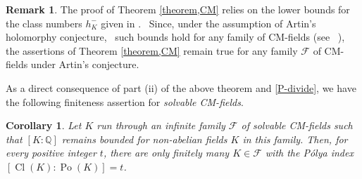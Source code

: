 \documentclass[12pt]{amsart}
\newtheorem{corollary}[theorem]{Corollary}
\theoremstyle{definition}
\newtheorem{remark}[theorem]{Remark}
\numberwithin{equation}{section}
\DeclareMathOperator{\Po}{Po}
\DeclareMathOperator{\Cl}{Cl}
\begin{document}
\begin{remark}
	The proof of Theorem \ref{theorem,CM} relies on the lower bounds for the class numbers $h_K^-$ given in \cite[Theorem 3.1]{Peng-Jie}.  Since, under the assumption of Artin's holomorphy conjecture,  such bounds hold for any family of CM-fields (see  \cite[Theorem 3.1]{Peng-Jie}), the assertions of Theorem \ref{theorem,CM} remain true for any family $\mathcal{F}$ of CM-fields under Artin's conjecture.
\end{remark}

As a direct consequence of part (ii) of the above theorem and \eqref{P-divide}, we have the following finiteness assertion for \textit{solvable CM-fields}.
\begin{corollary}
\label{cor-main}
{Let $K$ run through an infinite family $\mathcal{F}$ of solvable CM-fields such that $[K:\mathbb{Q}]$ remains bounded for non-abelian fields $K$ in this family. Then, for every positive integer $t$, there are only finitely many  $K \in \mathcal{F}$ with the P\'olya index $\left[\Cl(K): \Po(K)\right]=t$.}
 \end{corollary}
\end{document}
